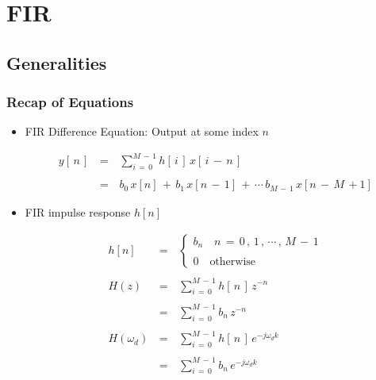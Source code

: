 \documentclass[12pt,a4paper]{book}
\begin{document}

\chapter{FIR}


\section{Generalities}

\subsection{Recap of Equations}

\begin{itemize}

\item FIR Difference Equation: Output at some index $n$



\begin{equation}
\begin{array}{rcl}
  
  y[ \, n \,] \, &=& \, \displaystyle\sum\limits_{i \, = \, 0}^{M \, - \, 1} h[\,i \,] \, x[\, i \, - \, n\, ] \\ \\
     &=& \, b_0 \, x[n] \, + \, b_1 \, x[n \, - \, 1] \, + \, \cdots \, b_{M \, - \, 1} \, x[n \, - \, M \, +1]
\end{array}    
\end{equation}


\item FIR impulse response $h[n]$

\begin{equation}
\begin{array}{rcl}
   h[n] \, &=&  \, \begin{cases}
    b_n \quad n \, = \, 0 \, , \, 1 \, , \, \cdots \, , \, M \, - \, 1 \\ \\
    0 \quad \text{otherwise}
    \end{cases} \\ \\
    H(z) \, &=& \, \displaystyle\sum\limits_{i \, = \, 0}^{M \, - \, 1} h[\,n \,] \, z^{-n} \\ \\
     &=& \, \displaystyle\sum\limits_{i \, = \, 0}^{M \, - \, 1} b_n \, z^{-n} \\ \\
     H(\omega_d) \, &=& \, \displaystyle\sum\limits_{i \, = \, 0}^{M \, - \, 1} h[\,n \,] \, e^{-j \omega_d k} \\ \\
    &=& \, \displaystyle\sum\limits_{i \, = \, 0}^{M \, - \, 1} b_n \, e^{-j \omega_d k}
\end{array}
\end{equation}


\end{itemize}
\end{document}

